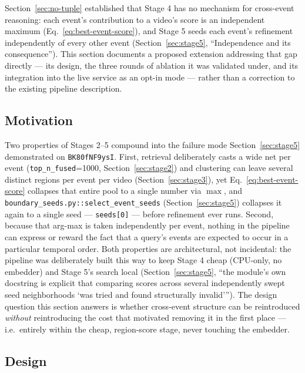 \documentclass[11pt]{article}
\newcommand{\code}[1]{\texttt{\small #1}}
\newcommand{\file}[1]{\texttt{\footnotesize #1}}
\begin{document}
Section~\ref{sec:no-tuple} established that Stage 4 has no mechanism for
cross-event reasoning: each event's contribution to a video's score is an
independent maximum (Eq.~\ref{eq:best-event-score}), and Stage 5 seeds each
event's refinement independently of every other event
(Section~\ref{sec:stage5}, ``Independence and its consequence''). This
section documents a proposed extension addressing that gap directly ---
its design, the three rounds of ablation it was validated under, and its
integration into the live service as an opt-in mode --- rather than a
correction to the existing pipeline description.

\subsection{Motivation}
Two properties of Stages 2--5 compound into the failure mode
Section~\ref{sec:stage5} demonstrated on \texttt{BK80fNF9ysI}. First,
retrieval deliberately casts a wide net per event
(\code{top\_n\_fused}=1000, Section~\ref{sec:stage2}) and clustering can
leave several distinct regions per event per video
(Section~\ref{sec:stage3}), yet Eq.~\ref{eq:best-event-score} collapses
that entire pool to a single number via $\max$, and
\file{boundary\_seeds.py::select\_event\_seeds} (Section~\ref{sec:stage5})
collapses it again to a single seed --- \code{seeds[0]} --- before
refinement ever runs. Second, because that arg-max is taken independently
per event, nothing in the pipeline can express or reward the fact that a
query's events are expected to occur in a particular temporal order. Both
properties are architectural, not incidental: the pipeline was deliberately
built this way to keep Stage 4 cheap (CPU-only, no embedder) and Stage 5's
search local (Section~\ref{sec:stage5}, ``the module's own docstring is
explicit that comparing scores across several independently swept seed
neighborhoods `was tried and found structurally invalid'''). The design
question this section answers is whether cross-event structure can be
reintroduced \emph{without} reintroducing the cost that motivated removing
it in the first place --- i.e.\ entirely within the cheap, region-score
stage, never touching the embedder.

\subsection{Design}
\label{sec:tuple-design}
\end{document}
